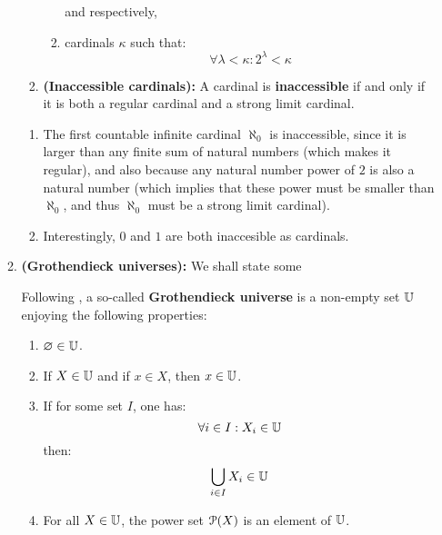 \begin{enumerate}
\begin{enumerate}
\begin{definition}
\begin{enumerate}
\begin{enumerate}
                                    and respectively,
                                    \item cardinals $\kappa$ such that:
                                        $$\forall \lambda < \kappa: 2^{\lambda} < \kappa$$
                                \end{enumerate}
                            \item \textbf{(Inaccessible cardinals):} A cardinal is \textbf{inaccessible} if and only if it is both a regular cardinal and a strong limit cardinal.
                        \end{enumerate}
                    \end{definition}
                    \begin{example}
                        \noindent
                        \begin{enumerate}
                            \item The first countable infinite cardinal $\aleph_0$ is inaccessible, since it is larger than any finite sum of natural numbers (which makes it regular), and also because any natural number power of $2$ is also a natural number (which implies that these power must be smaller than $\aleph_0$, and thus $\aleph_0$ must be a strong limit cardinal).
                            \item Interestingly, $0$ and $1$ are both inaccesible as cardinals.
                        \end{enumerate}
                    \end{example}
                \item \textbf{(Grothendieck universes):} We shall state some 
                    \begin{definition} \label{def: grothendieck_universes} 
                        Following \cite[Expos\'e I, Section 0]{sga4}, a so-called \textbf{Grothendieck universe} is a non-empty set $\mathbb{U}$ enjoying the following properties:
                            \begin{enumerate}
                                \item $\varnothing \in \mathbb{U}$.
                                \item If $X \in \mathbb{U}$ and if $x \in X$, then $x \in \mathbb{U}$.
                                \item If for some set $I$, one has:
                                    $$\forall i \in I: X_i \in \mathbb{U}$$
                                then:
                                    $$\bigcup_{i \in I} X_i \in \mathbb{U}$$
                                \item For all $X \in \mathbb{U}$, the power set $\mathcal{P}(X)$ is an element of $\mathbb{U}$.
                            \end{enumerate}
                    \end{definition}
                    

\end{enumerate}
\end{enumerate}
